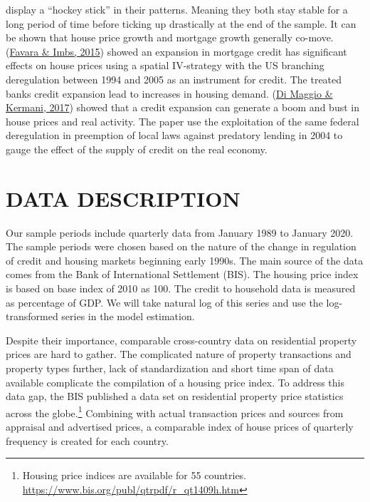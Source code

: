 \documentclass[
  12pt,
]{article}
\begin{document}
display a ``hockey stick'' in their patterns. Meaning they both stay stable for a long period of time before ticking up drastically at the end of the sample. It can be shown that house price growth and mortgage growth generally co-move. (\protect\hyperlink{ref-favara_credit_2015}{Favara \& Imbs, 2015}) showed an expansion in mortgage credit has significant effects on house prices using a spatial IV-strategy with the US branching deregulation between 1994 and 2005 as an instrument for credit. The treated banks credit expansion lead to increases in housing demand. (\protect\hyperlink{ref-di_maggio_credit-induced_2017}{Di Maggio \& Kermani, 2017}) showed that a credit expansion can generate a boom and bust in house prices and real activity. The paper use the exploitation of the same federal deregulation in preemption of local laws against predatory lending in 2004 to gauge the effect of the supply of credit on the real economy.

\hypertarget{data-description}{%
\section{DATA DESCRIPTION}\label{data-description}}

Our sample periods include quarterly data from January 1989 to January 2020. The sample periods were chosen based on the nature of the change in regulation of credit and housing markets beginning early 1990s. The main source of the data comes from the Bank of International Settlement (BIS). The housing price index is based on base index of 2010 as 100. The credit to household data is measured as percentage of GDP. We will take natural log of this series and use the log-transformed series in the model estimation.

Despite their importance, comparable cross-country data on residential property prices are hard to gather. The complicated nature of property transactions and property types further, lack of standardization and short time span of data available complicate the compilation of a housing price index. To address this data gap, the BIS published a data set on residential property price statistics across the globe.\footnote{Housing price indices are available for 55 countries. \url{https://www.bis.org/publ/qtrpdf/r_qt1409h.htm}} Combining with actual transaction prices and sources from appraisal and advertised prices, a comparable index of house prices of quarterly frequency is created for each country.
\end{document}
